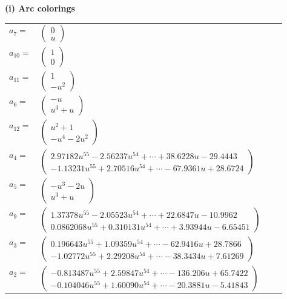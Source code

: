 \documentclass[1p]{elsarticle_modified}
\theoremstyle{definition}
\begin{document}
\flushleft \textbf{(i) Arc colorings}\\
\begin{tabular}{m{7pt} m{180pt} m{7pt} m{180pt} }
\flushright $a_{7}=$&$\begin{pmatrix}0\\u\end{pmatrix}$ \\
\flushright $a_{10}=$&$\begin{pmatrix}1\\0\end{pmatrix}$ \\
\flushright $a_{11}=$&$\begin{pmatrix}1\\- u^2\end{pmatrix}$ \\
\flushright $a_{6}=$&$\begin{pmatrix}- u\\u^3+u\end{pmatrix}$ \\
\flushright $a_{12}=$&$\begin{pmatrix}u^2+1\\- u^4-2 u^2\end{pmatrix}$ \\
\flushright $a_{4}=$&$\begin{pmatrix}2.97182 u^{55}-2.56237 u^{54}+\cdots+38.6228 u-29.4443\\-1.13231 u^{55}+2.70516 u^{54}+\cdots-67.9361 u+28.6724\end{pmatrix}$ \\
\flushright $a_{5}=$&$\begin{pmatrix}- u^3-2 u\\u^3+u\end{pmatrix}$ \\
\flushright $a_{9}=$&$\begin{pmatrix}1.37378 u^{55}-2.05523 u^{54}+\cdots+22.6847 u-10.9962\\0.0862068 u^{55}+0.310131 u^{54}+\cdots+3.93944 u-6.65451\end{pmatrix}$ \\
\flushright $a_{3}=$&$\begin{pmatrix}0.196643 u^{55}+1.09359 u^{54}+\cdots-62.9416 u+28.7866\\-1.02772 u^{55}+2.29208 u^{54}+\cdots-38.3434 u+7.61269\end{pmatrix}$ \\
\flushright $a_{2}=$&$\begin{pmatrix}-0.813487 u^{55}+2.59847 u^{54}+\cdots-136.206 u+65.7422\\-0.104046 u^{55}+1.60090 u^{54}+\cdots-20.3881 u-5.41843\end{pmatrix}$ \\

\end{tabular}
\end{document}
